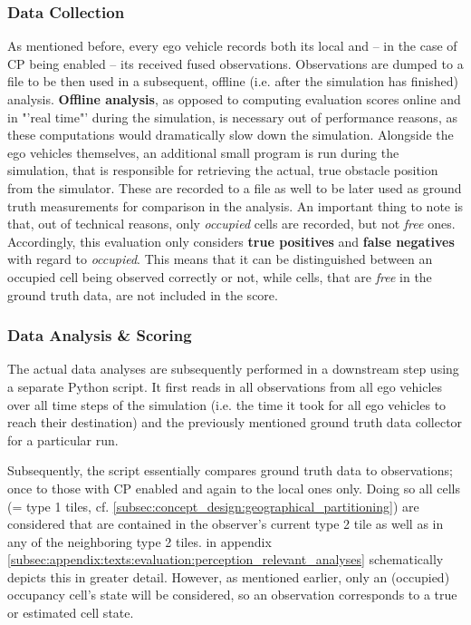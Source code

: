 \subsubsection{Data Collection}
As mentioned before, every ego vehicle records both its local and – in the case of CP being enabled – its received fused observations. Observations are dumped to a file to be then used in a subsequent, offline (i.e. after the simulation has finished) analysis. \textbf{Offline analysis}, as opposed to computing evaluation scores online and in "'real time"' during the simulation, is necessary out of performance reasons, as these computations would dramatically slow down the simulation. Alongside the ego vehicles themselves, an additional small program is run during the simulation, that is responsible for retrieving the actual, true obstacle position from the simulator. These are recorded to a file as well to be later used as ground truth measurements for comparison in the analysis. An important thing to note is that, out of technical reasons, only \textit{occupied} cells are recorded, but not \textit{free} ones. Accordingly, this evaluation only considers \textbf{true positives} and \textbf{false negatives} with regard to \textit{occupied}. This means that it can be distinguished between an occupied cell being observed correctly or not, while cells, that are \textit{free} in the ground truth data, are not included in the score.
\par
\bigskip

\subsubsection{Data Analysis \& Scoring}
The actual data analyses are subsequently performed in a downstream step using a separate Python script. It first reads in all observations from all ego vehicles over all time steps of the simulation (i.e. the time it took for all ego vehicles to reach their destination) and the previously mentioned ground truth data collector for a particular run.

Subsequently, the script essentially compares ground truth data to observations; once to those with CP enabled and again to the local ones only. Doing so all cells (= type 1 tiles, cf. \cref{subsec:concept_design:geographical_partitioning}) are considered that are contained in the observer's current type 2 tile as well as in any of the neighboring type 2 tiles.  in appendix \cref{subsec:appendix:texts:evaluation:perception_relevant_analyses} schematically depicts this in greater detail. However, as mentioned earlier, only an (occupied) occupancy cell's state will be considered, so an observation corresponds to a true or estimated cell state. 

